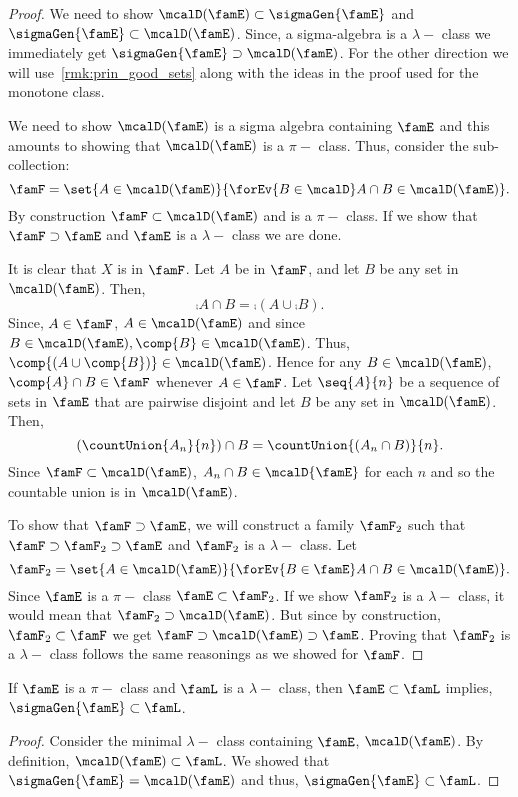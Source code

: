 \begin{proof}
    We need to show $\mcalD(\famE) \subset \sigmaGen{\famE}$ and $\sigmaGen{\famE}\subset \mcalD(\famE)$.
    Since, a sigma-algebra is a $\lambda-$ class we immediately get $\sigmaGen{\famE} \supset \mcalD(\famE)$.
    For the other direction we will use~\ref{rmk:prin_good_sets} along with the ideas in the proof used for
    the monotone class.

    We need to show $\mcalD(\famE)$ is a sigma algebra containing $\famE$ and this amounts to showing that
    $\mcalD(\famE)$ is a $\pi-$ class. Thus, consider the sub-collection:
    \[\famF = \set{A \in \mcalD(\famE)}{\forEv{B\in\mcalD} A\cap B \in \mcalD(\famE)}.\]
    By construction $\famF \subset \mcalD(\famE)$ and is a $\pi-$ class. If we show that 
    $\famF \supset \famE$ and $\famE$ is a $\lambda-$ class we are done. 

    It is clear that $X$ is in $\famF$. Let $A$ be in $\famF$, and let $B$ be any set in $\mcalD(\famE)$. 
    Then,
    \[\comp{A}\cap B = \comp{(A\cup \comp{B})}.\]
    Since, $A \in \famF$, $A \in \mcalD(\famE)$ and since $B \in \mcalD(\famE), \comp{B}\in\mcalD(\famE)$. Thus,
    $\comp{(A\cup \comp{B})}\in\mcalD(\famE)$. Hence for any $B \in \mcalD(\famE)$, $\comp{A}\cap B \in \famF$
    whenever $A \in \famF$. Let $\seq{A}{n}$ be a sequence of sets in $\famE$ that are pairwise disjoint
    and let $B$ be any set in
    $\mcalD(\famE)$. Then, 
    \[(\countUnion{A_n}{n})\cap B = \countUnion{(A_n\cap B)}{n}.\]
    Since $\famF \subset \mcalD(\famE)$, $A_n\cap B \in \mcalD{\famE}$ for each $n$ and so the countable union
    is in $\mcalD(\famE)$.

    To show that $\famF \supset \famE$, we will construct a family $\famF_{2}$ such that $\famF \supset
    \famF_{2}\supset \famE$ and $\famF_{2}$ is a $\lambda-$ class.
    Let \[\famF_{2} = \set{A \in \mcalD(\famE)}{\forEv{B\in\famE} A\cap B \in \mcalD(\famE)}.\]
    Since $\famE$ is a $\pi-$ class $\famE \subset \famF_{2}$. If we show $\famF_{2}$ is a $\lambda-$ class,
    it would mean that $\famF_2 \supset \mcalD(\famE)$. But since by construction, $\famF_2 \subset \famF$ we
    get $\famF \supset \mcalD(\famE) \supset \famE$. Proving that $\famF_2$ is a $\lambda-$ class follows the
    same reasonings as we showed for $\famF$.

\end{proof}
\begin{Theorem}[name=$\pi-\lambda$ Theorem]
    If $\famE$ is a $\pi-$ class and $\famL$ is a $\lambda-$ class, then $\famE \subset \famL$ implies,
    $\sigmaGen{\famE}\subset \famL$.
\end{Theorem}
\begin{proof}
    Consider the minimal $\lambda-$ class containing $\famE$, $\mcalD(\famE)$. By definition, 
    $\mcalD(\famE)\subset \famL$. We showed that $\sigmaGen{\famE} = \mcalD(\famE)$ and thus, 
    $\sigmaGen{\famE} \subset\famL$.
\end{proof}
